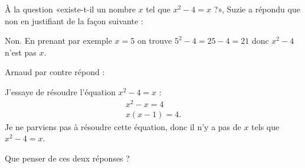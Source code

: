 
\begin{exercice}\label{exosmath-0562}

    À la question «existe-t-il un nombre \( x\) tel que \( x^2-4=x\) ?», Suzie a répondu que non en justifiant de la façon suivante : 

    \begin{fmpage}{0.9\linewidth}
        Non. En prenant par exemple \( x=5\) on trouve \( 5^2-4=25-4=21\) donc \( x^2-4\) n'est pas \( x\).
    \end{fmpage}

    Arnaud par contre répond :

    \begin{fmpage}{0.9\linewidth}
        J'essaye de résoudre l'équation \( x^2-4=x\) :
        \begin{subequations}
            \begin{align*}
                x^2-x=4\\
                x(x-1)=4.
            \end{align*}
        \end{subequations}
        Je ne parviens pas à résoudre cette équation, donc il n'y a pas de \( x\) tels que \( x^2-4=x\).
    \end{fmpage}

    Que penser de ces deux réponses ?

\end{exercice}
